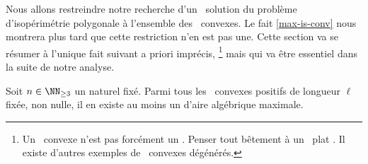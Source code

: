 Nous allons restreindre notre recherche d'un \ngone\ solution du problème d'isopérimétrie polygonale à l'ensemble des \ngones\ convexes. Le fait \ref{max-is-conv} nous montrera plus tard que cette restriction n'en est pas une. 
Cette section va se résumer à l'unique fait suivant a priori imprécis,%
\footnote{
    Un \ncycle\ convexe n'est pas forcément un \ngone. Penser tout bêtement à un \ncycle\ \og plat \fg.
    Il existe d'autres exemples de \ncycles\ convexes dégénérés.
}
mais qui va être essentiel dans la suite de notre analyse.




\begin{fact} \label{at-least-one}
    Soit $n \in \NN_{\geq3}$ un naturel fixé.
    Parmi tous les \ncycles\ convexes positifs de longueur $\ell$ fixée, non nulle, il en existe au moins un d'aire algébrique maximale.
\end{fact}


